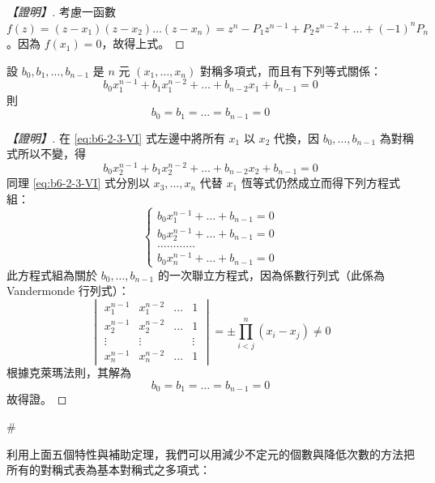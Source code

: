 \begin{proof}[【證明】]
考慮一函數 $f(z) = (z-x_1)(z-x_2)\dots(z-x_n) = z^n - P_1 z^{n-1} + P_2 z^{n-2} + \dots + (-1)^n P_n$。因為 $f(x_1)=0$，故得上式。
\end{proof}

\begin{lemma}\label{lem:b6-2-sym-vandermonde}
設 $b_0, b_1, \dots, b_{n-1}$ 是 $n$ 元 $(x_1, \dots, x_n)$ 對稱多項式，而且有下列等式關係：
\begin{equation}
b_0 x_1^{n-1} + b_1 x_1^{n-2} + \dots + b_{n-2} x_1 + b_{n-1} = 0 \tag{VI} \label{eq:b6-2-3-VI}
\end{equation}
則
\[ b_0 = b_1 = \dots = b_{n-1} = 0 \]
\end{lemma}

\begin{proof}[【證明】]
在 \eqref{eq:b6-2-3-VI} 式左邊中將所有 $x_1$ 以 $x_2$ 代換，因 $b_0, \dots, b_{n-1}$ 為對稱式所以不變，得
\[ b_0 x_2^{n-1} + b_1 x_2^{n-2} + \dots + b_{n-2} x_2 + b_{n-1} = 0 \]
同理 \eqref{eq:b6-2-3-VI} 式分別以 $x_3, \dots, x_n$ 代替 $x_1$ 恆等式仍然成立而得下列方程式組：
\[ \begin{cases}
b_0 x_1^{n-1} + \dots + b_{n-1} = 0 \\
b_0 x_2^{n-1} + \dots + b_{n-1} = 0 \\
\dots\dots\dots\dots \\
b_0 x_n^{n-1} + \dots + b_{n-1} = 0
\end{cases} \]
此方程式組為關於 $b_0, \dots, b_{n-1}$ 的一次聯立方程式，因為係數行列式（此係為 Vandermonde 行列式）：
\[ \begin{vmatrix}
x_1^{n-1} & x_1^{n-2} & \dots & 1 \\
x_2^{n-1} & x_2^{n-2} & \dots & 1 \\
\vdots & \vdots & & \vdots \\
x_n^{n-1} & x_n^{n-2} & \dots & 1
\end{vmatrix} = \pm \prod_{i<j}^n (x_i-x_j) \ne 0 \]
根據克萊瑪法則，其解為
\[ b_0 = b_1 = \dots = b_{n-1} = 0 \]
故得證。\end{proof}\hfill$\#$

利用上面五個特性與補助定理，我們可以用減少不定元的個數與降低次數的方法把所有的對稱式表為基本對稱式之多項式：

